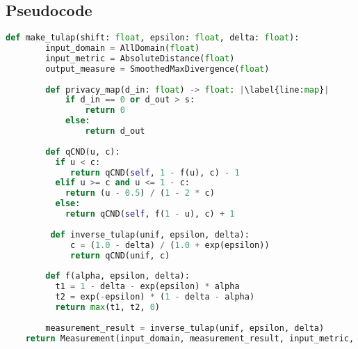 \documentclass{article}
\begin{document}
\subsection*{Pseudocode}


            




\begin{lstlisting}[language=Python, escapechar=|]
    def make_tulap(shift: float, epsilon: float, delta: float):
        input_domain = AllDomain(float)
        input_metric = AbsoluteDistance(float)
        output_measure = SmoothedMaxDivergence(float)
    
        def privacy_map(d_in: float) -> float: |\label{line:map}|
            if d_in == 0 or d_out > s:
                return 0
            else: 
                return d_out
                
        def qCND(u, c):
          if u < c:
             return qCND(self, 1 - f(u), c) - 1
          elif u >= c and u <= 1 - c:
            return (u - 0.5) / (1 - 2 * c)
          else:
            return qCND(self, f(1 - u), c) + 1
    
         def inverse_tulap(unif, epsilon, delta):
             c = (1.0 - delta) / (1.0 + exp(epsilon))
             return qCND(unif, c)
    
        def f(alpha, epsilon, delta):
          t1 = 1 - delta - exp(epsilon) * alpha
          t2 = exp(-epsilon) * (1 - delta - alpha)
          return max(t1, t2, 0)
    
        measurement_result = inverse_tulap(unif, epsilon, delta)
    return Measurement(input_domain, measurement_result, input_metric, output_measure, privacy_map)
\end{lstlisting}
\end{document}
